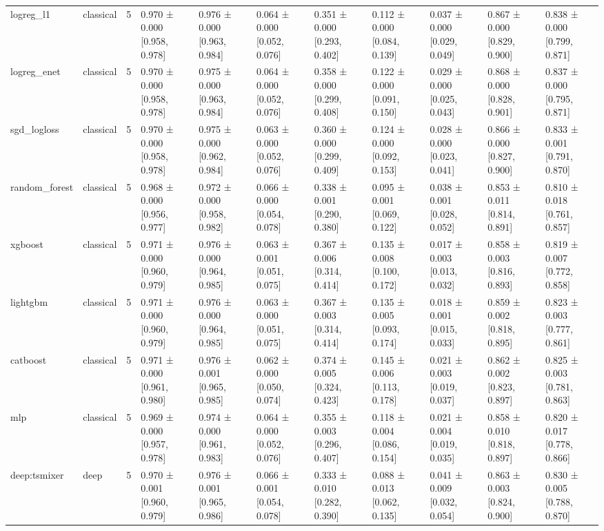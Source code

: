 \begin{table}
\begin{tabular}{llrllllllll}
logreg\_l1 & classical & 5 & 0.970 ± 0.000 [0.958, 0.978] & 0.976 ± 0.000 [0.963, 0.984] & 0.064 ± 0.000 [0.052, 0.076] & 0.351 ± 0.000 [0.293, 0.402] & 0.112 ± 0.000 [0.084, 0.139] & 0.037 ± 0.000 [0.029, 0.049] & 0.867 ± 0.000 [0.829, 0.900] & 0.838 ± 0.000 [0.799, 0.871] \\
logreg\_enet & classical & 5 & 0.970 ± 0.000 [0.958, 0.978] & 0.975 ± 0.000 [0.963, 0.984] & 0.064 ± 0.000 [0.052, 0.076] & 0.358 ± 0.000 [0.299, 0.408] & 0.122 ± 0.000 [0.091, 0.150] & 0.029 ± 0.000 [0.025, 0.043] & 0.868 ± 0.000 [0.828, 0.901] & 0.837 ± 0.000 [0.795, 0.871] \\
sgd\_logloss & classical & 5 & 0.970 ± 0.000 [0.958, 0.978] & 0.975 ± 0.000 [0.962, 0.984] & 0.063 ± 0.000 [0.052, 0.076] & 0.360 ± 0.000 [0.299, 0.409] & 0.124 ± 0.000 [0.092, 0.153] & 0.028 ± 0.000 [0.023, 0.041] & 0.866 ± 0.000 [0.827, 0.900] & 0.833 ± 0.001 [0.791, 0.870] \\
random\_forest & classical & 5 & 0.968 ± 0.000 [0.956, 0.977] & 0.972 ± 0.000 [0.958, 0.982] & 0.066 ± 0.000 [0.054, 0.078] & 0.338 ± 0.001 [0.290, 0.380] & 0.095 ± 0.001 [0.069, 0.122] & 0.038 ± 0.001 [0.028, 0.052] & 0.853 ± 0.011 [0.814, 0.891] & 0.810 ± 0.018 [0.761, 0.857] \\
xgboost & classical & 5 & 0.971 ± 0.000 [0.960, 0.979] & 0.976 ± 0.000 [0.964, 0.985] & 0.063 ± 0.001 [0.051, 0.075] & 0.367 ± 0.006 [0.314, 0.414] & 0.135 ± 0.008 [0.100, 0.172] & 0.017 ± 0.003 [0.013, 0.032] & 0.858 ± 0.003 [0.816, 0.893] & 0.819 ± 0.007 [0.772, 0.858] \\
lightgbm & classical & 5 & 0.971 ± 0.000 [0.960, 0.979] & 0.976 ± 0.000 [0.964, 0.985] & 0.063 ± 0.000 [0.051, 0.075] & 0.367 ± 0.003 [0.314, 0.414] & 0.135 ± 0.005 [0.093, 0.174] & 0.018 ± 0.001 [0.015, 0.033] & 0.859 ± 0.002 [0.818, 0.895] & 0.823 ± 0.003 [0.777, 0.861] \\
catboost & classical & 5 & 0.971 ± 0.000 [0.961, 0.980] & 0.976 ± 0.001 [0.965, 0.985] & 0.062 ± 0.000 [0.050, 0.074] & 0.374 ± 0.005 [0.324, 0.423] & 0.145 ± 0.006 [0.113, 0.178] & 0.021 ± 0.003 [0.019, 0.037] & 0.862 ± 0.002 [0.823, 0.897] & 0.825 ± 0.003 [0.781, 0.863] \\
mlp & classical & 5 & 0.969 ± 0.000 [0.957, 0.978] & 0.974 ± 0.000 [0.961, 0.983] & 0.064 ± 0.000 [0.052, 0.076] & 0.355 ± 0.003 [0.296, 0.407] & 0.118 ± 0.004 [0.086, 0.154] & 0.021 ± 0.004 [0.019, 0.035] & 0.858 ± 0.010 [0.818, 0.897] & 0.820 ± 0.017 [0.778, 0.866] \\
deep:tsmixer & deep & 5 & 0.970 ± 0.001 [0.960, 0.979] & 0.976 ± 0.001 [0.965, 0.986] & 0.066 ± 0.001 [0.054, 0.078] & 0.333 ± 0.010 [0.282, 0.390] & 0.088 ± 0.013 [0.062, 0.135] & 0.041 ± 0.009 [0.032, 0.054] & 0.863 ± 0.003 [0.824, 0.900] & 0.830 ± 0.005 [0.788, 0.870] \\

\end{tabular}
\end{table}
